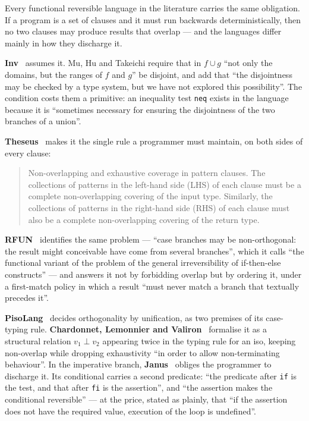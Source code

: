 \documentclass[runningheads,envcountsame]{llncs}
\begin{document}
Every functional reversible language in the literature carries the same
obligation. If a program is a set of clauses and it must run backwards
deterministically, then no two clauses may produce results that overlap --- and
the languages differ mainly in how they discharge it.

\textbf{Inv}~\cite{inv} assumes it. Mu, Hu and Takeichi require that in $f \cup g$
``not only the domains, but the ranges of $f$ and $g$'' be disjoint, and add that
``the disjointness may be checked by a type system, but we have not explored this
possibility''. The condition costs them a primitive: an inequality test
\texttt{neq} exists in the language because it is ``sometimes necessary for
ensuring the disjointness of the two branches of a union''.

\textbf{Theseus}~\cite{theseus} makes it the single rule a programmer must
maintain, on both sides of every clause:

\begin{quote}\small
Non-overlapping and exhaustive coverage in pattern clauses. The collections of
patterns in the left-hand side (LHS) of each clause must be a complete
non-overlapping covering of the input type. Similarly, the collections of patterns
in the right-hand side (RHS) of each clause must also be a complete
non-overlapping covering of the return type.
\end{quote}

\textbf{RFUN}~\cite{rfun} identifies the same problem --- ``case branches may be
non-orthogonal: the result might conceivable have come from several branches'',
which it calls ``the functional variant of the problem of the general
irreversibility of if-then-else constructs'' --- and answers it not by forbidding
overlap but by ordering it, under a first-match policy in which a result ``must
never match a branch that textually precedes it''.

\textbf{PisoLang}~\cite{pisolang} decides orthogonality by unification, as two
premises of its case-typing rule. \textbf{Chardonnet, Lemonnier and
Valiron}~\cite{chardonnet} formalise it as a structural relation $v_1 \perp v_2$
appearing twice in the typing rule for an iso, keeping non-overlap while dropping
exhaustivity ``in order to allow non-terminating behaviour''. In the imperative
branch, \textbf{Janus}~\cite{janus,lutz} obliges the programmer to discharge it.
Its conditional carries a second predicate: ``the predicate after \texttt{if} is
the test, and that after \texttt{fi} is the assertion'', and ``the assertion makes
the conditional reversible'' --- at the price, stated as plainly, that ``if the
assertion does not have the required value, execution of the loop is undefined''.
\end{document}

